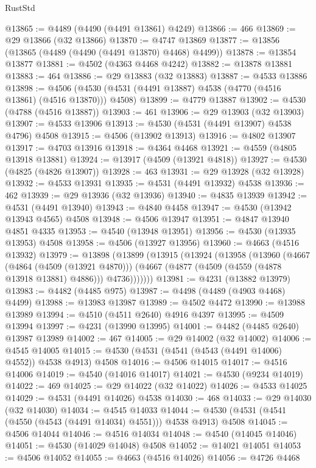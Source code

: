 \begin{lexlean}{RustStd}
\begin{coremodule}
{\begin{coremodule}
{{{{{{{{{{{{{{{{{{{{{{{{{{{{{{{{{{{{{{{{{{{{{{{{{{{{{{{@13865 := @4489 (@4490 (@4491 @13861) @4249)
@13866 := 466
@13869 := @29 @13866 (@32 @13866)
@13870 := @4747 @13869
@13877 := @13856 (@13865 (@4489 (@4490 (@4491 @13870) @4468) @4499))
@13878 := @13854 @13877
@13881 := @4502 (@4363 @4468 @4242)
@13882 := @13878 @13881
@13883 := 464
@13886 := @29 @13883 (@32 @13883)
@13887 := @4533 @13886
@13898 := @4506 (@4530 (@4531 (@4491 @13887) @4538 (@4770 (@4516 @13861) (@4516 @13870))) @4508)
@13899 := @4779 @13887
@13902 := @4530 (@4788 (@4516 @13887))
@13903 := 461
@13906 := @29 @13903 (@32 @13903)
@13907 := @4533 @13906
@13913 := @4530 (@4531 (@4491 @13907) @4538 @4796) @4508
@13915 := @4506 (@13902 @13913)
@13916 := @4802 @13907
@13917 := @4703 @13916
@13918 := @4364 @4468
@13921 := @4559 (@4805 @13918 @13881)
@13924 := @13917 (@4509 (@13921 @4818))
@13927 := @4530 (@4825 (@4826 @13907))
@13928 := 463
@13931 := @29 @13928 (@32 @13928)
@13932 := @4533 @13931
@13935 := @4531 (@4491 @13932) @4538
@13936 := 462
@13939 := @29 @13936 (@32 @13936)
@13940 := @4835 @13939
@13942 := @4531 (@4491 @13940)
@13943 := @4840 @4458
@13947 := @4530 (@13942 @13943 @4565) @4508
@13948 := @4506 @13947
@13951 := @4847 @13940 @4851 @4335
@13953 := @4540 (@13948 @13951)
@13956 := @4530 (@13935 @13953) @4508
@13958 := @4506 (@13927 @13956)
@13960 := @4663 (@4516 @13932)
@13979 := @13898
    (@13899
      (@13915
        (@13924
          (@13958
            (@13960
              (@4667
                (@4864 (@4509 (@13921 @4870)))
                (@4667 (@4877 (@4509 (@4559 (@4878 @13918 @13881) @4886))) @4736)))))))
@13981 := @4231 (@13882 @13979)
@13983 := @4482 (@4485 @975)
@13987 := @4498 (@4489 (@4903 @4468) @4499)
@13988 := @13983 @13987
@13989 := @4502 @4472
@13990 := @13988 @13989
@13994 := @4510 (@4511 @2640) @4916 @4397
@13995 := @4509 @13994
@13997 := @4231 (@13990 @13995)
@14001 := @4482 (@4485 @2640) @13987 @13989
@14002 := 467
@14005 := @29 @14002 (@32 @14002)
@14006 := @4545 @14005
@14015 := @4530 (@4531 (@4541 (@4543 (@4491 @14006) @4552)) @4538 @4913) @4508
@14016 := @4506 @14015
@14017 := @4516 @14006
@14019 := @4540 (@14016 @14017)
@14021 := @4530 (@9234 @14019)
@14022 := 469
@14025 := @29 @14022 (@32 @14022)
@14026 := @4533 @14025
@14029 := @4531 (@4491 @14026) @4538
@14030 := 468
@14033 := @29 @14030 (@32 @14030)
@14034 := @4545 @14033
@14044 := @4530 (@4531 (@4541 (@4550 (@4543 (@4491 @14034) @4551))) @4538 @4913) @4508
@14045 := @4506 @14044
@14046 := @4516 @14034
@14048 := @4540 (@14045 @14046)
@14051 := @4530 (@14029 @14048) @4508
@14052 := @14021 @14051
@14053 := @4506 @14052
@14055 := @4663 (@4516 @14026)
@14056 := @4726 @4468
}}}}}}}}}}}}}}}}}}}}}}}}}}}}}}}}}}}}}}}}}}}}}}}}}}}}}}}
\end{coremodule}}
\end{coremodule}
\end{lexlean}
